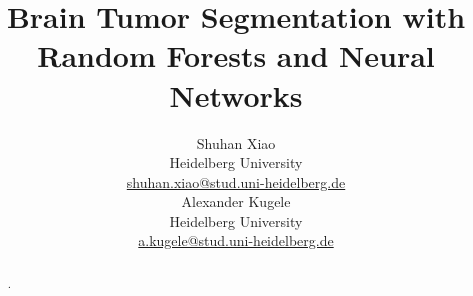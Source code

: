 \documentclass[final]{article}
\title{Brain Tumor Segmentation with Random Forests and Neural Networks}
\author{
  Shuhan Xiao \\
  Heidelberg University \\
  \href{mailto:shuhan.xiao@stud.uni-heidelberg.de}{shuhan.xiao@stud.uni-heidelberg.de}\\
  \And
  Alexander Kugele \\
  Heidelberg University \\
  \href{mailto:a.kugele@stud.uni-heidelberg.de}{a.kugele@stud.uni-heidelberg.de}\\
}
\begin{document}
\maketitle

\begin{abstract}
.
\end{abstract}

\section{}
\end{document}
